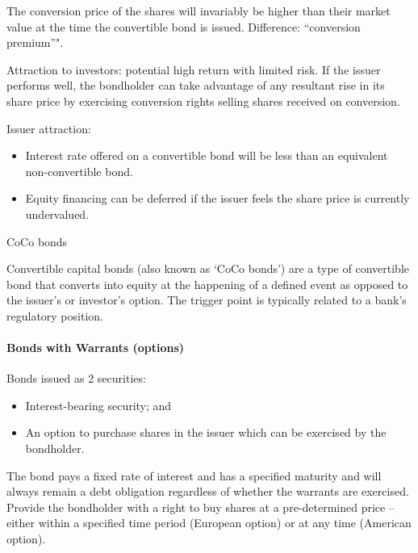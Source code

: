 \documentclass[
]{article}
\providecommand{\tightlist}{%
  \setlength{\itemsep}{0pt}\setlength{\parskip}{0pt}}
\newenvironment{env-9f1ad080-32f6-4f2b-8995-b682d7bd2848}
{
    \savenotes\tcolorbox[blanker,breakable,left=5pt,borderline west={2pt}{-4pt}{blue}]
}
{
    \endtcolorbox\spewnotes
}
\begin{document}
The conversion price of the shares will invariably be higher than their
market value at the time the convertible bond is issued. Difference:
``conversion premium''".

Attraction to investors: potential high return with limited risk. If the
issuer performs well, the bondholder can take advantage of any resultant
rise in its share price by exercising conversion rights selling shares
received on conversion.

Issuer attraction:

\begin{itemize}
\tightlist
\item
  Interest rate offered on a convertible bond will be less than an
  equivalent non-convertible bond.
\item
  Equity financing can be deferred if the issuer feels the share price
  is currently undervalued.
\end{itemize}

\begin{env-9f1ad080-32f6-4f2b-8995-b682d7bd2848}

CoCo bonds

Convertible capital bonds (also known as `CoCo bonds') are a type of
convertible bond that converts into equity at the happening of a defined
event as opposed to the issuer's or investor's option. The trigger point
is typically related to a bank's regulatory position.

\end{env-9f1ad080-32f6-4f2b-8995-b682d7bd2848}

\hypertarget{bonds-with-warrants-options}{%
\paragraph{Bonds with Warrants
(options)}\label{bonds-with-warrants-options}}

Bonds issued as 2 securities:

\begin{itemize}
\tightlist
\item
  Interest-bearing security; and
\item
  An option to purchase shares in the issuer which can be exercised by
  the bondholder.
\end{itemize}

The bond pays a fixed rate of interest and has a specified maturity and
will always remain a debt obligation regardless of whether the warrants
are exercised. Provide the bondholder with a right to buy shares at a
pre-determined price -- either within a specified time period (European
option) or at any time (American option).
\end{document}
